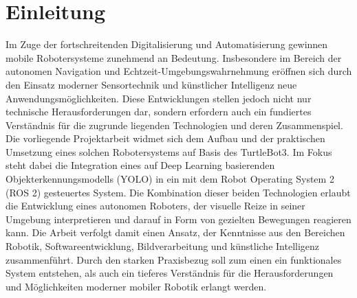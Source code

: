 \section{Einleitung}\label{sec:einleitung}
Im Zuge der fortschreitenden Digitalisierung und Automatisierung gewinnen mobile Robotersysteme zunehmend an Bedeutung. 
Insbesondere im Bereich der autonomen Navigation und Echtzeit-Umgebungswahrnehmung eröffnen sich durch den Einsatz moderner Sensortechnik und künstlicher Intelligenz neue Anwendungsmöglichkeiten. 
Diese Entwicklungen stellen jedoch nicht nur technische Herausforderungen dar, sondern erfordern auch ein fundiertes Verständnis für die zugrunde liegenden Technologien und deren Zusammenspiel.
\newPar
Die vorliegende Projektarbeit widmet sich dem Aufbau und der praktischen Umsetzung eines solchen Robotersystems auf Basis des TurtleBot3. 
Im Fokus steht dabei die Integration eines auf Deep Learning basierenden Objekterkennungsmodells (YOLO) in ein mit dem Robot Operating System 2 (ROS 2) gesteuertes System. 
Die Kombination dieser beiden Technologien erlaubt die Entwicklung eines autonomen Roboters, der visuelle Reize in seiner Umgebung interpretieren und darauf in Form von gezielten Bewegungen reagieren kann.
\newPar
Die Arbeit verfolgt damit einen Ansatz, der Kenntnisse aus den Bereichen Robotik, Softwareentwicklung, Bildverarbeitung und künstliche Intelligenz zusammenführt. 
Durch den starken Praxisbezug soll zum einen ein funktionales System entstehen, als auch ein tieferes Verständnis für die Herausforderungen und Möglichkeiten moderner mobiler Robotik erlangt werden.

